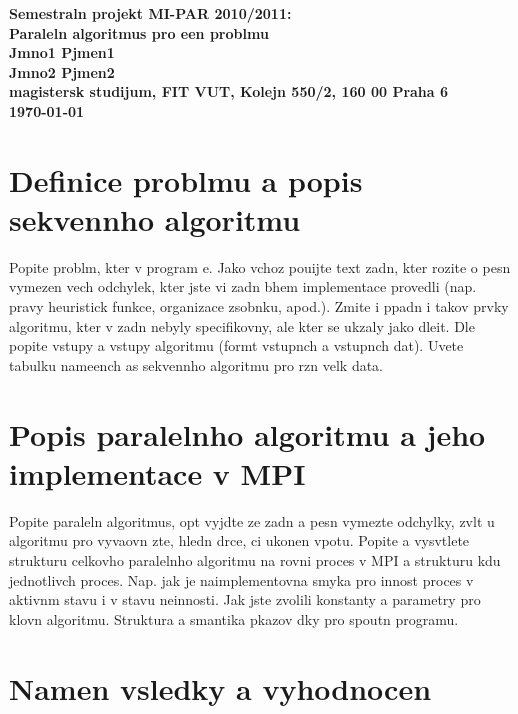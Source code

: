 \documentclass[12pt]{article}
\begin{document}

\begin{center}
\bf Semestraln projekt MI-PAR 2010/2011:\\[5mm]
    Paraleln algoritmus pro een problmu\\[5mm]
       Jmno1 Pjmen1\\
       Jmno2 Pjmen2\\[2mm]
magistersk studijum, FIT VUT, Kolejn 550/2, 160 00 Praha 6\\[2mm]
\today
\end{center}

\section{Definice problmu a popis sekvennho algoritmu}

Popite problm, kter v program e. Jako vchoz pouijte text
zadn, kter rozite o pesn vymezen vech odchylek, kter jste
vi zadn bhem implementace provedli (nap.  pravy heuristick
funkce, organizace zsobnku, apod.). Zmite i ppadn i takov
prvky algoritmu, kter v zadn nebyly specifikovny, ale kter se
ukzaly jako dleit.  Dle popite vstupy a vstupy algoritmu
(formt vstupnch a vstupnch dat). Uvete tabulku nameench as
sekvennho algoritmu pro rzn velk data.

\section{Popis paralelnho algoritmu a jeho implementace v MPI}

Popite paraleln algoritmus, opt vyjdte ze zadn a pesn
vymezte odchylky, zvlt u algoritmu pro vyvaovn zte, hledn
drce, ci ukonen vpotu.  Popite a vysvtlete strukturu
celkovho paralelnho algoritmu na rovni proces v MPI a strukturu
kdu jednotlivch proces. Nap. jak je naimplementovna smyka pro
innost proces v aktivnm stavu i v stavu neinnosti. Jak jste
zvolili konstanty a parametry pro klovn algoritmu. Struktura a
smantika pkazov dky pro spoutn programu.

\section{Namen vsledky a vyhodnocen}
\end{document}
